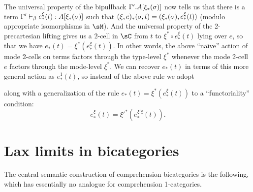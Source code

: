 \documentclass{amsart}
\let\To\Rightarrow
\let\types\vdash
\def\type{\;\mathsf{type}}
\let\jdeq\equiv
\begin{document}
\begin{itemize}
  The universal property of the bipullback $\Gamma'.A[\xi_*(\sigma)]$ now tells us that there is a term $\Gamma' \types_{\be} e^\xi_*(t) : A[\xi_*(\si)]$ such that $(\xi,e)_*(\sigma,t) = (\xi_*(\sigma),e^\xi_*(t))$ (modulo appropriate isomorphisms in $\sM$).
  And the universal property of the 2-precartesian lifting gives us a 2-cell in $\sC$ from $t$ to $\xi^*\circ e^\xi_*(t)$ lying over $e$, so that we have $e_*(t) = \xi^*(e^\xi_*(t))$.
  In other words, the above ``na\"{\i}ve'' action of mode 2-cells on terms factors through the type-level $\xi^*$ whenever the mode 2-cell $e$ factors through the mode-level $\xi^*$.
  We can recover $e_*(t)$ in terms of this more general action as $e^1_*(t)$, so instead of the above rule we adopt
  along with a generalization of the rule $e_*(t) = \xi^*(e^\xi_*(t))$ to a ``functoriality'' condition:
  \[ e^\xi_*(t) = {\xi'}^*(e^{\xi'\xi}_*(t)). \]
\end{itemize}



\section{Lax limits in bicategories}
\label{sec:laxlim}

The central semantic construction of comprehension bicategories is the following, which has essentially no analogue for comprehension 1-categories.
\end{document}
